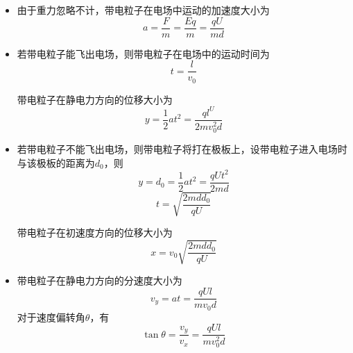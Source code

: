 \begin{itemize}
\item 由于重力忽略不计，带电粒子在电场中运动的加速度大小为
\begin{equation}
a = \frac{F}{m} = \frac{Eq}{m} = \frac{qU}{md}
\end{equation}

\item 若带电粒子能飞出电场，则带电粒子在电场中的运动时间为
\begin{equation}
t = \frac{l}{v_0}
\end{equation}

带电粒子在静电力方向的位移大小为
\begin{equation}
y = \frac12 at^2 = \frac{ql^U}{2mv_0^2 d}
\end{equation}

\item 若带电粒子不能飞出电场，则带电粒子将打在极板上，设带电粒子进入电场时与该极板的距离为$d_0$，则
\begin{equation}
y = d_0 = \frac12 at^2 = \frac{qUt^2}{2md}
\end{equation}
\begin{equation}
t = \sqrt{\frac{2mdd_0}{qU}}
\end{equation}

带电粒子在初速度方向的位移大小为
\begin{equation}
x = v_0\sqrt{\frac{2mdd_0}{qU}}
\end{equation}

\item 带电粒子在静电力方向的分速度大小为
\begin{equation}
v_y = at = \frac{qUl}{mv_0d}
\end{equation}
对于速度偏转角$\theta$，有
\begin{equation}
\tan \theta = \frac{v_y}{v_x} = \frac{qUl}{mv_0^2 d}
\end{equation}
\end{itemize}
